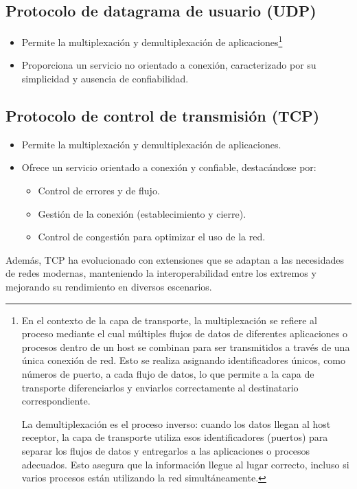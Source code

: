 \documentclass[a4paper,12pt]{article}
\begin{document}
\subsection*{Protocolo de datagrama de usuario (UDP)}
\begin{itemize}
    \item Permite la multiplexación y demultiplexación de aplicaciones\footnote{En el contexto de la capa de transporte, la multiplexación se refiere al proceso mediante el cual múltiples flujos de datos de diferentes aplicaciones o procesos dentro de un host se combinan para ser transmitidos a través de una única conexión de red. Esto se realiza asignando identificadores únicos, como números de puerto, a cada flujo de datos, lo que permite a la capa de transporte diferenciarlos y enviarlos correctamente al destinatario correspondiente.

    La demultiplexación es el proceso inverso: cuando los datos llegan al host receptor, la capa de transporte utiliza esos identificadores (puertos) para separar los flujos de datos y entregarlos a las aplicaciones o procesos adecuados. Esto asegura que la información llegue al lugar correcto, incluso si varios procesos están utilizando la red simultáneamente.}
    \item Proporciona un servicio no orientado a conexión, caracterizado por su simplicidad y ausencia de confiabilidad.
\end{itemize}

\subsection*{Protocolo de control de transmisión (TCP)}
\begin{itemize}
    \item Permite la multiplexación y demultiplexación de aplicaciones.
    \item Ofrece un servicio orientado a conexión y confiable, destacándose por:
    \begin{itemize}
        \item Control de errores y de flujo.
        \item Gestión de la conexión (establecimiento y cierre).
        \item Control de congestión para optimizar el uso de la red.
    \end{itemize}
\end{itemize}

Además, TCP ha evolucionado con extensiones que se adaptan a las necesidades de redes modernas, manteniendo la interoperabilidad entre los extremos y mejorando su rendimiento en diversos escenarios.
\end{document}
